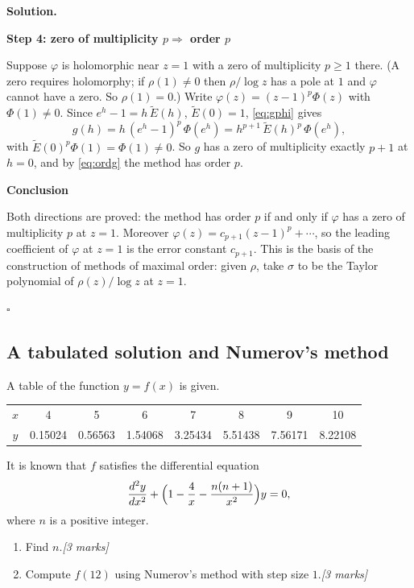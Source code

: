 \documentclass[11pt,a4paper]{article}
\newenvironment{solution}
  {\par\noindent\textbf{Solution.}\par\nobreak}
  {\par\hfill\(\square\)\par}
\newcommand{\step}[1]{\par\addvspace{0.5em}\noindent\textbf{#1}\par\nobreak}
\newcommand{\mk}[1]{\hfill\textit{[#1 marks]}}
\begin{document}
\begin{solution}
\step{Step 4: zero of multiplicity \(p\Rightarrow\) order \(p\)}
Suppose \(\varphi\) is holomorphic near \(z=1\) with a zero of
multiplicity \(p\ge1\) there.  (A zero requires holomorphy; if
\(\rho(1)\ne0\) then \(\rho/\log z\) has a pole at \(1\) and \(\varphi\)
cannot have a zero.  So \(\rho(1)=0\).)  Write
\(\varphi(z)=(z-1)^p\Phi(z)\) with \(\Phi(1)\ne0\).  Since
\(e^h-1=h\,\tilde E(h)\), \(\tilde E(0)=1\), \eqref{eq:gphi} gives
\[
  g(h)=h\,(e^h-1)^p\,\Phi(e^h)=h^{p+1}\,\tilde E(h)^p\,\Phi(e^h),
\]
with \(\tilde E(0)^p\Phi(1)=\Phi(1)\ne0\).  So \(g\) has a zero of
multiplicity exactly \(p+1\) at \(h=0\), and by \eqref{eq:ordg} the
method has order \(p\).

\step{Conclusion}
Both directions are proved: the method has order \(p\) if and only if
\(\varphi\) has a zero of multiplicity \(p\) at \(z=1\).  Moreover
\(\varphi(z)=c_{p+1}(z-1)^p+\cdots\), so the leading coefficient of
\(\varphi\) at \(z=1\) is the error constant \(c_{p+1}\).  This is
the basis of the construction of methods of maximal order: given
\(\rho\), take \(\sigma\) to be the Taylor polynomial of
\(\rho(z)/\log z\) at \(z=1\).
\end{solution}

\subsection{A tabulated solution and Numerov's method}

\begin{qbox}
A table of the function \(y=f(x)\) is given.
\begin{center}
\renewcommand{\arraystretch}{1.2}
\begin{tabular}{@{}c|ccccccc@{}}
\toprule
\(x\)&4&5&6&7&8&9&10\\
\(y\)&0.15024&0.56563&1.54068&3.25434&5.51438&7.56171&8.22108\\
\bottomrule
\end{tabular}
\end{center}
It is known that \(f\) satisfies the differential equation
\[
  \frac{d^2y}{dx^2}+\Bigl(1-\frac4x-\frac{n(n+1)}{x^2}\Bigr)y=0,
\]
where \(n\) is a positive integer.
\begin{enumerate}[label=(\alph*)]
  \item Find \(n\).\mk{3}
  \item Compute \(f(12)\) using Numerov's method with step size
    \(1\).\mk{3}
\end{enumerate}
\end{qbox}
\end{document}
